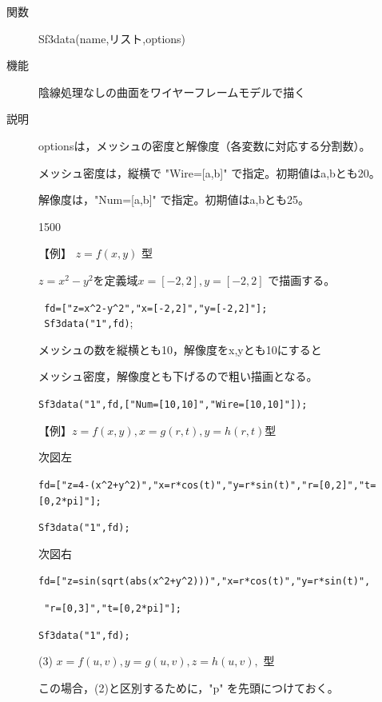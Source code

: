 \documentclass[papersize,a4paper,12pt,uplatex]{jsarticle}
\begin{document}
\begin{description}

\vspace{\baselineskip}
\hypertarget{sf3data}{}
\item[関数]Sf3data(name,リスト,options)
\item[機能]陰線処理なしの曲面をワイヤーフレームモデルで描く
\item[説明]optionsは，メッシュの密度と解像度（各変数に対応する分割数）。

メッシュ密度は，縦横で "Wire=[a,b]" で指定。初期値はa,bとも20。

解像度は，"Num=[a,b]" で指定。初期値はa,bとも25。

\begin{layer}{150}{0}
\end{layer}

\vspace{\baselineskip}
【例】 $z=f(x,y)$ 型
 
 $z=x^2-y^2$を定義域$x=[-2,2],y=[-2,2]$ で描画する。

\verb| fd=["z=x^2-y^2","x=[-2,2]","y=[-2,2]"];|\\
\verb| Sf3data("1",fd)|;

メッシュの数を縦横とも10，解像度をx,yとも10にすると
 
 メッシュ密度，解像度とも下げるので粗い描画となる。
 
\verb|Sf3data("1",fd,["Num=[10,10]","Wire=[10,10]"]);|

\vspace{\baselineskip}
【例】$z=f(x,y),x=g(r,t),y=h(r,t)$型

次図左

\verb|fd=["z=4-(x^2+y^2)","x=r*cos(t)","y=r*sin(t)","r=[0,2]","t=[0,2*pi]"];|

\verb|Sf3data("1",fd);|

次図右

\verb|fd=["z=sin(sqrt(abs(x^2+y^2)))","x=r*cos(t)","y=r*sin(t)",|

\verb| "r=[0,3]","t=[0,2*pi]"];|
 
\verb|Sf3data("1",fd);|

\begin{center}   \end{center}

(3) $x=f(u,v),y=g(u,v),z=h(u,v),$ 型

この場合，(2)と区別するために，"p" を先頭につけておく。


\end{description}
\end{document}
